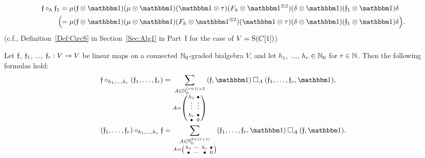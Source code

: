 \documentclass[\MainFolder/Text.tex]{subfiles}
\begin{document}
\begin{Definition}
\begin{align*}
\MVMorF \circ_h \MVMorF_1 &= \MVProd(\MVMorF\otimes \Id)(\MVProd\otimes\Id)(\Id\otimes\tau)(F_h\otimes\Id^{\otimes 2})(\MVCoProd\otimes \Id)(\MVMorF_1 \otimes \Id)\MVCoProd \\
\Bigl(\!\!&= \MVProd(\MVMorF\otimes \Id)(\MVProd\otimes\Id)(F_h\otimes\Id^{\otimes 2})(\Id\otimes\tau)(\MVCoProd\otimes \Id)(\MVMorF_1 \otimes \Id)\MVCoProd\Bigr).
\end{align*}
(c.f., Definition~\ref{Def:CircS} in Section~\ref{Sec:Alg1} in Part~I for the case of $V = \mathrm{S}(C[1])$)
\end{Definition}

\begin{Proposition}\label{Prop:PartCompAComp}
Let $\mathfrak{f}$, $\mathfrak{f}_1$, $\dotsc$, $\mathfrak{f}_r : V \rightarrow V$ be linear maps on a connected $\mathbb{N}_0$-graded bialgebra $V$, and let $h_1$,~$\dotsc$, $h_r \in \mathbb{N}_0$ for $r\in \mathbb{N}$. Then the following formulas hold:
\begin{align*}
\MVMorF\circ_{h_1, \dotsc, h_r}(\MVMorF_1, \dotsc, \MVMorF_r) &= \sum_{\substack{A \in \N_0^{(r+1)\times 2} \\ A = \left(\begin{smallmatrix}
h_1 & \bullet \\
\vphantom{\int\limits^x}\smash{\vdots} &  \smash{\vdots} \\
h_r & \bullet \\ 
\bullet & 0
\end{smallmatrix}\right)}} (\MVMorF,\Id)\SquareComp_{A}(\MVMorF_1,\dotsc,\MVMorF_r,\Id), \\
(\MVMorF_1, \dotsc, \MVMorF_r)\circ_{h_1, \dotsc, h_r}\MVMorF &= \sum_{\substack{A \in \N_0^{2\times(r+1)} \\ A = \left(\begin{smallmatrix}
h_1 & \dotsb & h_r & \bullet \\
\bullet & \dotsb & \bullet & 0
\end{smallmatrix}\right)
}} (\MVMorF_1,\dotsc,\MVMorF_r,\Id)\SquareComp_A(\MVMorF,\Id).
\end{align*}
\end{Proposition}
\end{document}
